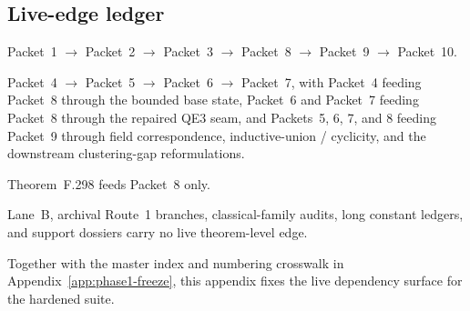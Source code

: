 \subsection*{Live-edge ledger}
\begin{description}[leftmargin=2.2em,style=nextline]
\item[Route~1 chain.] Packet~1 $\to$ Packet~2 $\to$ Packet~3 $\to$ Packet~8 $\to$ Packet~9 $\to$ Packet~10.
\item[Lane~A chain.] Packet~4 $\to$ Packet~5 $\to$ Packet~6 $\to$ Packet~7, with Packet~4 feeding Packet~8 through the bounded base state, Packet~6 and Packet~7 feeding Packet~8 through the repaired QE3 seam, and Packets~5, 6, 7, and 8 feeding Packet~9 through field correspondence, inductive-union / cyclicity, and the downstream clustering-gap reformulations.
\item[Sole auxiliary certification edge.] Theorem~F.298 feeds Packet~8 only.
\item[Explicit exclusions.] Lane~B, archival Route~1 branches, classical-family audits, long constant ledgers, and support dossiers carry no live theorem-level edge.
\end{description}

Together with the master index and numbering crosswalk in Appendix~\ref{app:phase1-freeze}, this appendix fixes the live dependency surface for the hardened suite.
